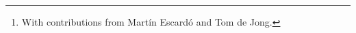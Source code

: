 \documentclass[oneside,a4paper]{book}
\title{#1}
\begin{document}
\author{Jonathan Sterling\thanks{With contributions from Mart\'in Escard\'o and Tom de Jong.}}




\backmatter

\printbibliography
\end{document}
